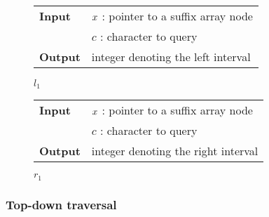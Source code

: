 \begin{figure*}[t!]
\begin{minipage}[t]{.5\textwidth}
\begin{algorithm}[H]
\begin{tabular}{ll}
\textbf{Input}  & $x$ : pointer to a suffix array node\\
				& $c$ : character to query\\
\textbf{Output} & integer denoting the left interval\\
\end{tabular}
\begin{algorithmic}[1]
	\Else
	\EndIf
\EndWhile
\State \Return $l_1$
\end{algorithmic}
\label{alg:sa-lower}
\end{algorithm}
\end{minipage}
\hfill
\begin{minipage}[t]{.5\textwidth}
\begin{algorithm}[H]
\begin{tabular}{ll}
\textbf{Input}  & $x$ : pointer to a suffix array node\\
				& $c$ : character to query\\
\textbf{Output} & integer denoting the right interval\\
\end{tabular}
\begin{algorithmic}[1]
	\Else
	\EndIf
\EndWhile
\State \Return $r_1$
\end{algorithmic}
\label{alg:sa-upper}
\end{algorithm}
\end{minipage}
\end{figure*}

\subsubsection{Top-down traversal}


